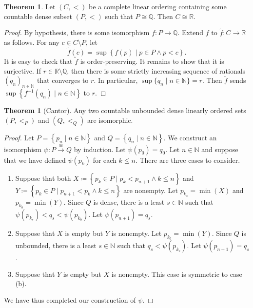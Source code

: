 \documentclass[10pt,letterpaper,cm]{nupset}
\theoremstyle{definition}
\theoremstyle{theorem}
\newtheorem{theorem}[definition]{Theorem}
\theoremstyle{remark}
\newcommand{\N}{\mathbb N}
\newcommand{\Q}{\mathbb Q}
\newcommand{\R}{\mathbb R}
\newcommand{\1}{\mathbf{1}}
\newcommand{\0}{\vec 0}
\begin{document}
\begin{theorem}
 Let $\left(C, <\right)$ be a complete linear ordering  containing some countable dense subset $\left(P, <\right)$ such that $P \cong \Q$. Then $C\cong \R$. 
\end{theorem}
\begin{proof} 
 By hypothesis, there is some isomorphism $f: P \to \Q$. Extend $f$ to $\tilde{f} : C \to \R$ as follows. For any $c \in C \setminus P$, let $$\tilde{f}(c)  = \sup\left\{f(p) \mid p\in P \land p < c\right\}.$$ It is easy to check that $\tilde{f}$ is order-preserving. It remains to show that it is surjective. If $r\in \R \setminus \Q$, then there is some strictly increasing sequence of rationals $\left(q_n\right)_{n\in \N}$ that converges to $r$. In particular, $\sup\{q_n \mid n\in \N\}  = r$. Then $\tilde{f}$ sends $\sup\left\{f^{-1}(q_n) \mid n \in \N\right\}$ to $r$.
\end{proof}

\smallskip

\begin{theorem}[Cantor]
 Any two countable unbounded dense linearly ordered sets $\left(P, <_P\right)$ and $\left(Q, <_Q\right)$ are isomorphic. 
\end{theorem}
\begin{proof} 
Let $P = \left\{p_n \mid n \in \N\right\}$ and $Q = \left\{q_n \mid n\in \N\right\}$. We construct an isomorphism $\psi : P \overset{\cong}{\longrightarrow} Q$ by induction. Let $\psi(p_0)= q_0$. Let $n\in \N$ and suppose that we have defined $\psi(p_k)$ for each $k\leq n$. There are three cases to consider.
\begin{enumerate}[label=(\alph*)]
\item Suppose that both $X\coloneqq \left\{ p_k \in P \mid p_k < p_{n+1} \land k \leq n\right\}$ and $Y \coloneqq \left\{ p_k \in P \mid p_{n+1} < p_k \land k \leq n\right\}$  are nonempty. Let $p_{k_s} = \min(X)$ and $p_{k_b} = \min(Y)$. Since $Q$ is dense, there is a least $s\in \N$ such that $\psi(p_{k_s}) < q_s < \psi(p_{k_b})$. Let $\psi(p_{n+1}) = q_s$. 
\item Suppose that $X$ is empty but $Y$ is nonempty. Let $p_{k_b} = \min(Y)$. Since $Q$ is unbounded, there is a least $s\in \N$ such that $q_s < \psi(p_{k_s})$. Let $\psi(p_{n+1}) = q_s$. 
\item Suppose that  $Y$ is empty but $X$ is nonempty. This case is symmetric to case (b).
\end{enumerate}
We have thus completed our construction of $\psi$.
\end{proof}
\end{document}
